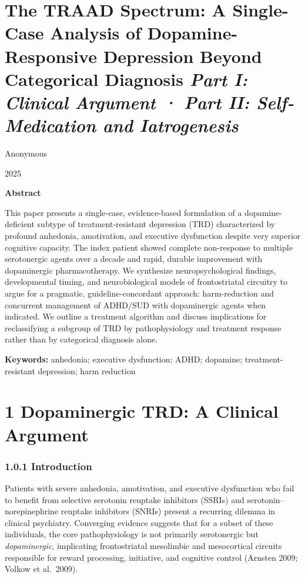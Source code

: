 ﻿\section{\texorpdfstring{\textbf{The TRAAD Spectrum:} A Single-Case Analysis of Dopamine-Responsive Depression Beyond Categorical Diagnosis \emph{Part I: Clinical Argument · Part II: Self-Medication and Iatrogenesis}}{The TRAAD Spectrum: A Single-Case Analysis of Dopamine-Responsive Depression Beyond Categorical Diagnosis Part I: Clinical Argument · Part II: Self-Medication and Iatrogenesis}}\label{10b_traad-the-traad-spectrum-a-single-case-analysis-of-dopamine-responsive-depression-beyond-categorical-diagnosis-part-i-clinical-argument-part-ii-self-medication-and-iatrogenesis}

Anonymous

2025

\textbf{Abstract}

This paper presents a single-case, evidence-based formulation of a dopamine-deficient subtype of treatment-resistant depression (TRD) characterized by profound anhedonia, amotivation, and executive dysfunction despite very superior cognitive capacity. The index patient showed complete non-response to multiple serotonergic agents over a decade and rapid, durable improvement with dopaminergic pharmacotherapy. We synthesize neuropsychological findings, developmental timing, and neurobiological models of frontostriatal circuitry to argue for a pragmatic, guideline-concordant approach: harm-reduction and concurrent management of ADHD/SUD with dopaminergic agents when indicated. We outline a treatment algorithm and discuss implications for reclassifying a subgroup of TRD by pathophysiology and treatment response rather than by categorical diagnosis alone.

\textbf{Keywords:} anhedonia; executive dysfunction; ADHD; dopamine; treatment-resistant depression; harm reduction

\section{1 Dopaminergic TRD: A Clinical Argument}\label{10b_traad-dopaminergic-trd-a-clinical-argument}

\subsubsection{1.0.1 Introduction}\label{10b_traad-introduction}

Patients with severe anhedonia, amotivation, and executive dysfunction who fail to benefit from selective serotonin reuptake inhibitors (SSRIs) and serotonin--norepinephrine reuptake inhibitors (SNRIs) present a recurring dilemma in clinical psychiatry. Converging evidence suggests that for a subset of these individuals, the core pathophysiology is not primarily serotonergic but \emph{dopaminergic}, implicating frontostriatal mesolimbic and mesocortical circuits responsible for reward processing, initiative, and cognitive control (Arnsten 2009; Volkow et al.~2009).

